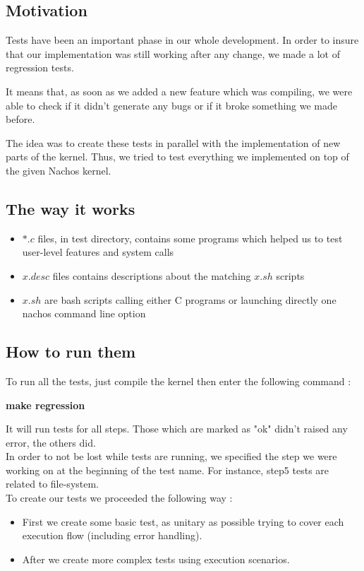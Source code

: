 \subsection{Motivation}
Tests have been an important phase in our whole development. In order to insure
that our implementation was still working after any change, we made a lot of
regression tests. 

It means that, as soon as we added a new feature which was compiling, we were
able to check if it didn't generate any bugs or if it broke something we made before.

The idea was to create these tests in parallel with the implementation of new
parts of the kernel. Thus, we tried to test everything we implemented on top of
the given Nachos kernel.

\subsection{The way it works}
\begin{itemize}
    \item $*.c$ files, in test directory, contains some programs which helped us to
        test user-level features and system calls
    \item $x.desc$ files contains descriptions about the matching $x.sh$ scripts
    \item $x.sh$ are bash scripts calling either C programs or launching directly
        one nachos command line option
\end{itemize}


\subsection{How to run them}
To run all the tests, just compile the kernel then enter the following command :

\textbf{make regression}

It will run tests for all steps. Those which are marked as "ok" didn't raised
any error, the others did.\\

In order to not be lost while tests are running, we specified the step we were
working on at the beginning of the test name. For instance, step5 tests are
related to file-system.\\

To create our tests we proceeded the following way :
\begin{itemize}
    \item First we create some basic test, as unitary as possible trying to
        cover each execution flow (including error handling). 
    \item After we create more complex tests using execution scenarios.
\end{itemize}


